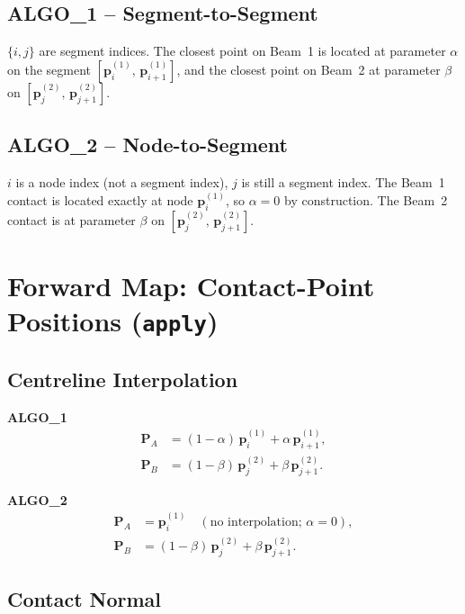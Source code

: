 \documentclass[11pt, a4paper]{article}
\newcommand{\vv}[1]{\bm{#1}}
\begin{document}
\subsection{ALGO\_1 -- Segment-to-Segment}

$\{i,j\}$ are segment indices.
The closest point on Beam~1 is located at parameter $\alpha$ on the
segment $[\vv{p}^{(1)}_i,\, \vv{p}^{(1)}_{i+1}]$, and the closest
point on Beam~2 at parameter $\beta$ on $[\vv{p}^{(2)}_j,\, \vv{p}^{(2)}_{j+1}]$.

\subsection{ALGO\_2 -- Node-to-Segment}

$i$ is a node index (not a segment index), $j$ is still a segment index.
The Beam~1 contact is located exactly at node $\vv{p}^{(1)}_i$, so
$\alpha = 0$ by construction.
The Beam~2 contact is at parameter $\beta$ on
$[\vv{p}^{(2)}_j,\, \vv{p}^{(2)}_{j+1}]$.

\section{Forward Map: Contact-Point Positions (\texttt{apply})}

\subsection{Centreline Interpolation}

\textbf{ALGO\_1}
\begin{align}
  \vv{P}_A &= (1-\alpha)\,\vv{p}^{(1)}_i + \alpha\,\vv{p}^{(1)}_{i+1},
  \label{eq:PA_algo1}\\
  \vv{P}_B &= (1-\beta)\,\vv{p}^{(2)}_j + \beta\,\vv{p}^{(2)}_{j+1}.
  \label{eq:PB}
\end{align}

\textbf{ALGO\_2}
\begin{align}
  \vv{P}_A &= \vv{p}^{(1)}_i
  \quad (\text{no interpolation; }{\alpha = 0}),
  \label{eq:PA_algo2}\\
  \vv{P}_B &= (1-\beta)\,\vv{p}^{(2)}_j + \beta\,\vv{p}^{(2)}_{j+1}.
  \label{eq:PB_algo2}
\end{align}

\subsection{Contact Normal}
\end{document}
